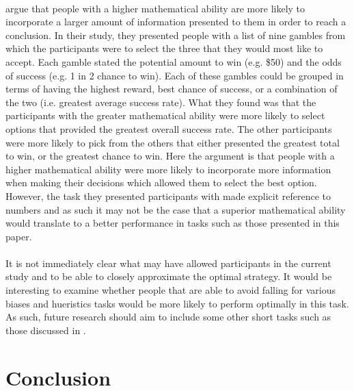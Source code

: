 \documentclass[12pt]{article}
\begin{document}
\paragraph{} \cite{jasper2017numeracy} argue that people with a higher mathematical ability are more likely to incorporate a larger amount of information presented to them in order to reach a conclusion. In their study, they presented people with a list of nine gambles from which the participants were to select the three that they would most like to accept. Each gamble stated the potential amount to win (e.g. \$50) and the odds of success (e.g. 1 in 2 chance to win). Each of these gambles could be grouped in terms of having the highest reward, best chance of success, or a combination of the two (i.e. greatest average success rate). What they found was that the participants with the greater mathematical ability were more likely to select options that provided the greatest overall success rate. The other participants were more likely to pick from the others that either presented the greatest total to win, or the greatest chance to win. Here the argument is that people with a higher mathematical ability were more likely to incorporate more information when making their decisions which allowed them to select the best option. However, the task they presented participants with made explicit reference to numbers and as such it may not be the case that a superior mathematical ability would translate to a better performance in tasks such as those presented in this paper. 

\paragraph{} It is not immediately clear what may have allowed participants in the current study and \cite{clarke2015failure} to be able to closely approximate the optimal strategy. It would be interesting to examine whether people that are able to avoid falling for various biases and hueristics tasks would be more likely to perform optimally in this task. As such, future research should aim to include some other short tasks such as those discussed in \cite{Toplak2011}. 

\section*{Conclusion}
\end{document}
